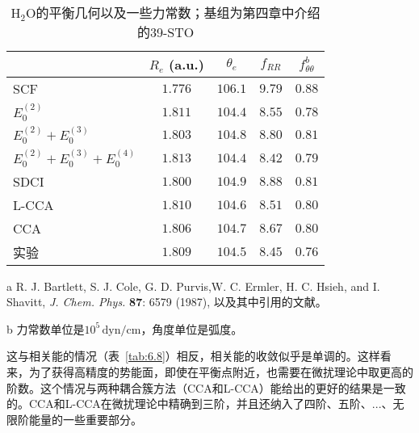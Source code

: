 \begin{table}
	\centering
	\caption{$\mathrm{H_2O}$的平衡几何以及一些力常数；基组为第四章中介绍的39-STO}
	\begin{threeparttable}
		\begin{tabular}{lcccc}
			\hline & $R_e$ (a.u.) & $\theta_e$ & $f_{R R}$\tnote{b} & $f_{\theta \theta}^b$ \\
			\hline SCF & $1.776$ & $106.1$ & $9.79$ & $0.88$ \\
			$E_0^{(2)}$ & $1.811$ & $104.4$ & $8.55$ & $0.78$ \\
			$E_0^{(2)}+E_0^{(3)}$ & $1.803$ & $104.8$ & $8.80$ & $0.81$ \\
			$E_0^{(2)}+E_0^{(3)}+E_0^{(4)}$ & $1.813$ & $104.4$ & $8.42$ & $0.79$ \\
			SDCI & $1.800$ & $104.9$ & $8.88$ & $0.81$ \\
			L-CCA & $1.810$ & $104.6$ & $8.51$ & $0.80$ \\
			CCA & $1.806$ & $104.7$ & $8.67$ & $0.80$ \\
			实验 & $1.809$ & $104.5$ & $8.45$ & $0.76$ \\
			\hline
		\end{tabular}
		\begin{tablenotes}
			\item[a] R. J. Bartlett, S. J. Cole, G. D. Purvis,W. C. Ermler, H. C. Hsieh, and I. Shavitt, \textit{J. Chem. Phys.} \textbf{87}: 6579 (1987), 以及其中引用的文献。
			\item[b] 力常数单位是$10^5\,\mathrm{dyn/cm}$，角度单位是弧度。
		\end{tablenotes}
	\end{threeparttable}
\label{tab:6.9}
\end{table}

这与相关能的情况（表~\autoref{tab:6.8}）相反，相关能的收敛似乎是单调的。这样看来，为了获得高精度的势能面，即使在平衡点附近，也需要在微扰理论中取更高的阶数。这个情况与两种耦合簇方法（CCA和L-CCA）能给出的更好的结果是一致的。CCA和L-CCA在微扰理论中精确到三阶，并且还纳入了四阶、五阶、...、无限阶能量的一些重要部分。


